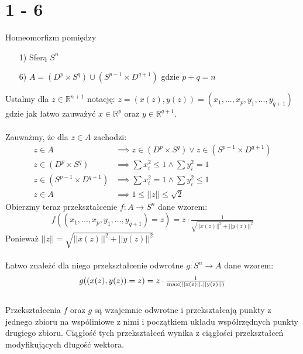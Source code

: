\newpage
\section*{1 - 6}
Homeomorfizm pomiędzy
\begin{itemize}
  \item[1)] Sferą $S^n$
  \item[6)] $A = (D^p \times S^q) \cup (S^{p-1} \times D^{q+1})$ gdzie $p+q = n$
\end{itemize}
Ustalmy dla $ z \in \mathbb{R}^{n+1}$ notację: $  z = (x(z), y(z)) = (x_1, ..., x_p, y_1, ..., y_{q+1}) $ gdzie jak łatwo zauważyć $x \in \mathbb{R}^p$ oraz $y \in \mathbb{R}^{q+1} $. \\
\\
Zauważmy, że dla $z \in A$ zachodzi:
\begin{align*}
  z \in A & \implies z \in (D^p \times S^q) \lor z \in (S^{p-1} \times D^{q+1}) \\
  z \in (D^p \times S^q) & \implies \sum x_i^2 \leq 1 \land \sum y_i^2 = 1 \\
  z \in (S^{p-1} \times D^{q+1}) & \implies \sum x_i^2 = 1 \land \sum y_i^2 \leq 1 \\
  z \in A & \implies 1 \leq ||z|| \leq \sqrt{2}
\end{align*}
Obierzmy teraz przekształcenie $ f : A \to S^n $ dane wzorem:
\begin{equation*}
  f((x_1, ..., x_p, y_1, ..., y_{q+1}) = z) = z \cdot \tfrac{1}{\sqrt{||x(z)||^2 + ||y(z)||^2}}
\end{equation*}
Ponieważ $ ||z|| = \sqrt{||x(z)||^2 + ||y(z)||^2} $\\
\\
Łatwo znależć dla niego przekształcenie odwrotne $ g : S^n \to A $ dane wzorem:
\begin{equation*}
  g((x(z), y(z)) = z) = z \cdot \tfrac{1}{\rm max(||x(z)||, ||y(z)||)}
\end{equation*}
\\
Przekształcenia $f$ oraz $g$ są wzajemnie odwrotne i przekształcają punkty z jednego zbioru na wspóliniowe z nimi i początkiem układu współrzędnych punkty drugiego zbioru. Ciągłość tych przekształceń wynika z ciągłości przekształceń modyfikujących długość wektora.
